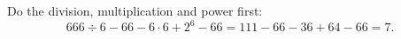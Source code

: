 Do the division, multiplication and power first:
\[666\div6-66-6\cdot6+2^6-66=111-66-36+64-66=\boxed{7}.\]
